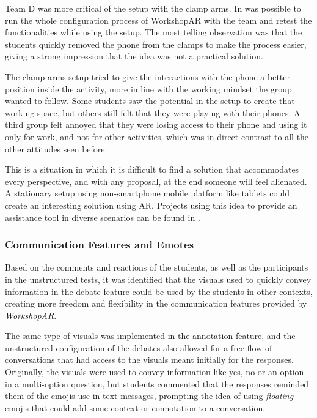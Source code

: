 Team D was more critical of the setup with the clamp arms. In was possible to run the whole configuration process of WorkshopAR with the team and retest the
functionalities while using the setup. The most telling observation was that the students quickly removed the phone from the clamps to make the process easier, giving a
strong impression that the idea was not a practical solution.

The clamp arms setup tried to give the interactions with the phone a better position inside the activity, more in line with the working mindset the group wanted to follow.
Some students saw the potential in the setup to create that working space, but others still felt that they were playing with their phones. A third group felt annoyed that
they were losing access to their phone and using it only for work, and not for other activities, which was in direct contrast to all the other attitudes seen before.

This is a situation in which it is difficult to find a solution that accommodates every perspective, and with any proposal, at the end someone will feel alienated. A
stationary setup using non-smartphone mobile platform like tablets could create an interesting solution using \ac{AR}. Projects using this idea to provide an assistance
tool in diverse scenarios can be found in \textcite{barbieri_2025,ma_2026}.

\subsubsection{Communication Features and Emotes \label{sec:6-8-2-2}}

Based on the comments and reactions of the students, as well as the participants in the unstructured tests, it was identified that the visuals used to quickly convey
information in the debate feature could be used by the students in other contexts, creating more freedom and flexibility in the communication features provided by
\emph{WorkshopAR}.

The same type of visuals was implemented in the annotation feature, and the unstructured configuration of the debates also allowed for a free flow of conversations that
had access to the visuals meant initially for the responses. Originally, the visuals were used to convey information like yes, no or an option in a multi-option question,
but students commented that the responses reminded them of the emojis use in text messages, prompting the idea of using \emph{floating} emojis that could add some context
or connotation to a conversation.

